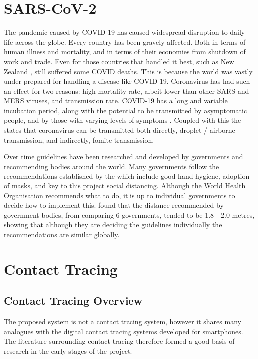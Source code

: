 \documentclass{l4proj}
\begin{document}
\section{SARS-CoV-2}

The pandemic caused by COVID-19 has caused widespread disruption to daily life across the globe. Every country has been gravely affected. Both in terms of human illness and mortality, and in terms of their economies from shutdown of work and trade. Even for those countries that handled it best, such as New Zealand \citep{robert_lessons_2020}, still suffered some COVID deaths. This is because the world was vastly under prepared for handling a disease like COVID-19. Coronavirus has had such an effect for two reasons: high mortality rate, albeit lower than other SARS and MERS viruses, and transmission rate. COVID-19 has a long and variable incubation period, along with the potential to be transmitted by asymptomatic people, and by those with varying levels of symptoms \citep{vannabouathong_novel_2020}. Coupled with this the \citet{world_health_organisation_transmission_2020} states that coronavirus can be transmitted both directly, droplet / airborne transmission, and indirectly, fomite transmission.

Over time guidelines have been researched and developed by governments and recommending bodies around the world. Many governments follow the recommendations established by the \cite{world_health_organization_responding_2020} which include good hand hygiene, adoption of masks, and key to this project social distancing. Although the World Health Organisation recommends what to do, it is up to individual governments to decide how to implement this.\citet{yoo_comparative_2020} found that the distance recommended by government bodies, from comparing 6 governments, tended to be 1.8 - 2.0 metres, showing that although they are deciding the guidelines individually the recommendations are similar globally.

\section{Contact Tracing}

\subsection{Contact Tracing Overview}

The proposed system is not a contact tracing system, however it shares many analogues with the digital contact tracing systems developed for smartphones. The literature surrounding contact tracing therefore formed a good basis of research in the early stages of the project.
\end{document}
